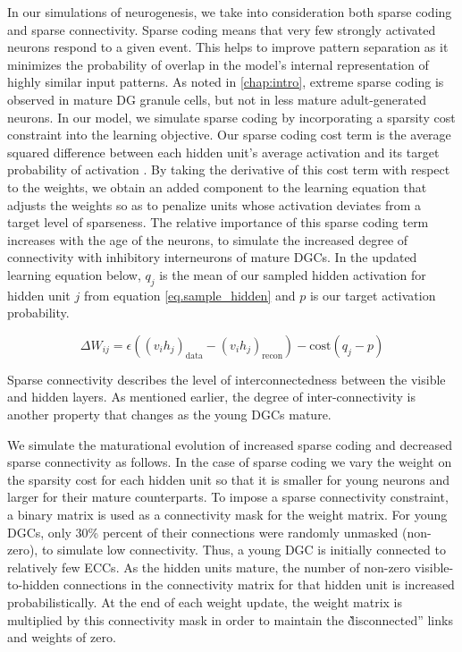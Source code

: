 In our simulations of neurogenesis, we take into consideration both sparse
coding and sparse connectivity. 
Sparse coding means that very few strongly activated neurons respond to a given event. 
This helps to improve pattern separation as it minimizes the probability of
overlap in the model's internal representation of highly 
similar input patterns. 
As noted in \cref{chap:intro}, extreme sparse coding is observed in
mature DG granule cells, but not in less mature adult-generated neurons.  
In our model, we simulate sparse coding by incorporating 
a sparsity cost constraint into the learning objective. 
Our sparse coding cost term is the average squared difference between each 
hidden unit's average activation and its target probability of activation \citep{nair-hinton-09}. 
By taking the derivative of this cost term with respect to the weights, we
obtain an added component to the learning equation that adjusts the weights so
as to penalize units whose activation deviates from a target level of
sparseness. 
The relative importance of this sparse coding term increases with the 
age of the neurons, to simulate the increased degree of connectivity with
inhibitory interneurons of mature DGCs.  
In the updated learning equation below, $q_j$ is the mean of our sampled hidden activation 
for hidden unit $j$ from equation 
\ref{eq.sample_hidden} and $p$ is our target activation probability.

\begin{equation}
\Delta W_{ij} = \epsilon ((v_{i}h_{j})_{\mathrm{data}} - (v_{i}h_{j})_{\mathrm{recon}}) - \mathrm{cost}(q_j - p) \label{eq.sparse_rbm}
\end{equation}

Sparse connectivity describes the level of interconnectedness between the
visible and hidden layers.  
As mentioned earlier, the degree of inter-connectivity is another property
that changes as the young \acp{DGC} mature. 

We simulate the maturational evolution of increased sparse coding and
decreased sparse connectivity as follows. 
In the case of sparse coding we vary the weight on the sparsity cost for each hidden
unit so that it is smaller for young neurons and larger for their mature
counterparts. 
To impose a sparse connectivity constraint, a binary matrix 
is used as a connectivity mask for the weight matrix. 
For young \acp{DGC}, only 30\% percent of their connections were 
randomly unmasked (non-zero), to simulate low connectivity. 
Thus, a young \ac{DGC} is initially connected to relatively few ECCs.  
As the hidden units
mature, the number of non-zero visible-to-hidden  
connections in the connectivity matrix for that hidden unit is increased
probabilistically. 
At the end of each weight update, 
the weight matrix is multiplied by this connectivity mask in order to maintain
the \`\`disconnected'' links and weights of zero. 

